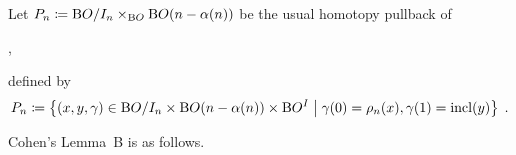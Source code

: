 \begin{Def*}
  Let $P_n\coloneqq \mathrm{B}O/I_{n} \times_{\mathrm{B}O}\mathrm{B}O(n-\alpha(n))$
  be the usual homotopy pullback of
  \begin{center}
    ,
  \end{center}
  \idest defined by
  \begin{gather*}
    P_n
    \coloneqq \left\{
      (x, y, \gamma)
      \in \mathrm{B}O/I_{n}\times \mathrm{B}O(n-\alpha(n))\times \mathrm{B}O^I
      \;\middle|\;
      \gamma(0) = \rho_n(x), \gamma(1) = \mathrm{incl}(y)
    \right\}
    \;.
  \end{gather*}
\end{Def*}
Cohen's Lemma~B is as follows.
